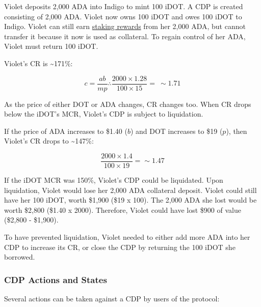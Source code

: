\documentclass{article}
\begin{document}
\begin{sloppypar}
Violet deposits 2,000 ADA into Indigo to mint 100 iDOT. A CDP is created
consisting of 2,000 ADA. Violet now owns 100 iDOT and owes 100 iDOT to
Indigo. Violet can still earn
\protect\hyperlink{cdp-liquid-staking}{staking rewards} from her 2,000
ADA, but cannot transfer it because it now is used as collateral. To
regain control of her ADA, Violet must return 100 iDOT.

Violet's CR is \textasciitilde171\%:

\[c = \frac{ab}{mp} \therefore \frac{2000 \times 1.28}{100 \times 15} = \  \sim 1.71\]

As the price of either DOT or ADA changes, CR changes too. When CR drops
below the iDOT's MCR, Violet's CDP is subject to liquidation.

If the price of ADA increases to \$1.40 (\(b\)) and DOT increases to
\$19 (\(p\)), then Violet's CR drops to \textasciitilde147\%:

\[\frac{2000 \times 1.4}{100 \times 19} = \sim 1.47\]

If the iDOT MCR was 150\%, Violet's CDP could be liquidated. Upon
liquidation, Violet would lose her 2,000 ADA collateral deposit. Violet
could still have her 100 iDOT, worth \$1,900 (\$19 x 100). The 2,000 ADA
she lost would be worth \$2,800 (\$1.40 x 2000). Therefore, Violet could
have lost \$900 of value (\$2,800 - \$1,900).

To have prevented liquidation, Violet needed to either add more ADA into
her CDP to increase its CR, or close the CDP by returning the 100 iDOT
she borrowed.

\hypertarget{cdp-actions-and-states}{%
\subsubsection{CDP Actions and States}\label{cdp-actions-and-states}}

Several actions can be taken against a CDP by users of the protocol:


\end{sloppypar}
\end{document}
